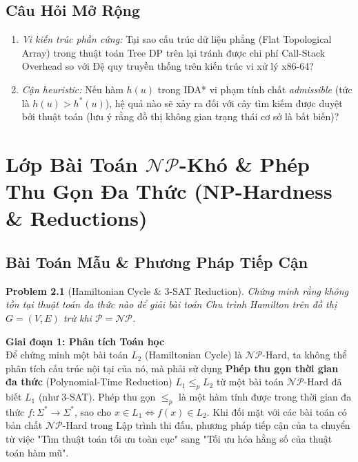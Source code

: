 \documentclass[11pt, letterpaper]{report}
\newtheorem{baitoan}{Problem}[chapter]
\begin{document}
\section{Câu Hỏi Mở Rộng}
\begin{enumerate}
 \item \textit{Vi kiến trúc phần cứng:} Tại sao cấu trúc dữ liệu phẳng (Flat Topological Array) trong thuật toán Tree DP trên lại tránh được chi phí Call-Stack Overhead so với Đệ quy truyền thống trên kiến trúc vi xử lý x86-64?
 \item \textit{Cận heuristic:} Nếu hàm $h(u)$ trong IDA* vi phạm tính chất \textit{admissible} (tức là $h(u) > h^*(u)$), hệ quả nào sẽ xảy ra đối với cây tìm kiếm được duyệt bởi thuật toán (lưu ý rằng đồ thị không gian trạng thái cơ sở là bất biến)?
\end{enumerate}


\chapter{Lớp Bài Toán \texorpdfstring{$\mathcal{NP}$}{NP}-Khó \& Phép Thu Gọn Đa Thức (NP-Hardness \& Reductions)}
\label{mod:np_hard}

\section{Bài Toán Mẫu \& Phương Pháp Tiếp Cận}
\begin{baitoan}[Hamiltonian Cycle \& 3-SAT Reduction]
Chứng minh rằng không tồn tại thuật toán đa thức nào để giải bài toán Chu trình Hamilton trên đồ thị $G=(V,E)$ trừ khi $\mathcal{P} = \mathcal{NP}$.
\end{baitoan}

\noindent\textbf{Giai đoạn 1: Phân tích Toán học}\\
Để chứng minh một bài toán $L_2$ (Hamiltonian Cycle) là $\mathcal{NP}$-Hard, ta không thể phân tích cấu trúc nội tại của nó, mà phải sử dụng \textbf{Phép thu gọn thời gian đa thức} (Polynomial-Time Reduction) $L_1 \le_p L_2$ từ một bài toán $\mathcal{NP}$-Hard đã biết $L_1$ (như 3-SAT).
Phép thu gọn $\le_p$ là một hàm tính được trong thời gian đa thức $f: \Sigma^* \to \Sigma^*$, sao cho $x \in L_1 \iff f(x) \in L_2$.
Khi đối mặt với các bài toán có bản chất $\mathcal{NP}$-Hard trong Lập trình thi đấu, phương pháp tiếp cận của ta chuyển từ việc "Tìm thuật toán tối ưu toàn cục" sang "Tối ưu hóa hằng số của thuật toán hàm mũ".
\end{document}
